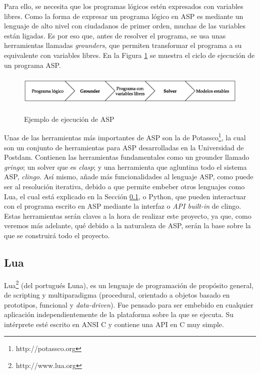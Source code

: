 Para ello, se necesita que los programas lógicos estén expresados con variables libres. Como la forma de expresar un programa lógico en ASP es mediante un lenguaje de alto nivel con ciudadanos de primer orden, muchas de las variables están ligadas. Es por eso que, antes de resolver el programa, se usa unas herramientas llamadas \textit{grounders}, que permiten transformar el programa a su equivalente con variables libres. En la Figura \ref{fig:asp} se muestra el ciclo de ejecución de un programa ASP. \\

\begin{figure}[h]
	\centering
	\includegraphics[height=4em]{images/ASP}
	\label{fig:asp}
	\caption{Ejemplo de ejecución de ASP}
\end{figure}

Unas de las herramientas más importantes de ASP son la de Potassco\footnote{http://potassco.org}, la cual son un conjunto de herramientas para ASP desarrolladas en la Universidad de Postdam. Contienen las herramientas fundamentales como un grounder llamado \textit{gringo}; un solver que es \textit{clasp}; y una herramienta que agluntina todo el sistema ASP, \textit{clingo}. Así mismo, añade más funcionalidades al lenguaje ASP, como puede ser al resolución iterativa, debido a que permite embeber otros lenguajes como Lua, el cual está explicado en la Sección \ref{subsec:lua}, o Python, que pueden interactuar con el programa escrito en ASP mediante la interfaz o \textit{API built-in} de clingo. \\

Estas herramientas serán claves a la hora de realizar este proyecto, ya que, como veremos más adelante, qué debido a la naturaleza de ASP, serán la base sobre la que se construirá todo el proyecto.

\subsection{Lua}\label{subsec:lua}

Lua\footnote{http://www.lua.org} \cite{Ierusalimschy:2016:PLF:3002843} (del portugués Luna), es un lenguaje de programación de propósito general, de scripting y multiparadigma (procedural, orientado a objetos basado en prototipos, funcional y \textit{data-driven}). Fue pensado para ser embebido en cualquier aplicación independientemente de la plataforma sobre la que se ejecuta. Su intérprete esté escrito en ANSI C y contiene una API en C muy simple. \\

